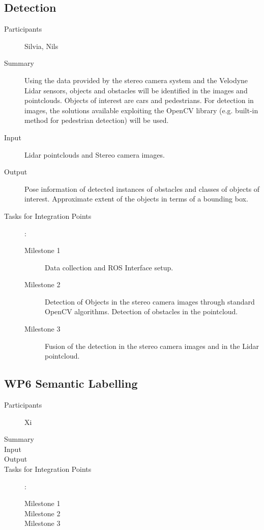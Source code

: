 \documentclass[11pt,a4paper]{article}
\begin{document}
\subsection{Detection} %

\begin{description}
\item[Participants] Silvia, Nils
\item[Summary]
	Using the data provided by the stereo camera system and the Velodyne Lidar sensors, objects and obstacles will be identified in the images and pointclouds. Objects of interest are cars and pedestrians. For detection in images, the solutions available exploiting the OpenCV library (e.g. built-in method for pedestrian detection) will be used. 
\item[Input]
	Lidar pointclouds and Stereo camera images.
\item[Output]
	Pose information of detected instances of obstacles and classes of objects of interest. Approximate extent of the objects in terms of a bounding box.
\item[Tasks for Integration Points]:\
	\begin{description}
		\item[Milestone 1]
			Data collection and ROS Interface setup.
		\item[Milestone 2]
			Detection of Objects in the stereo camera images through standard OpenCV algorithms. Detection of obstacles in the pointcloud.
		\item[Milestone 3]
			Fusion of the detection in the stereo camera images and in the Lidar pointcloud.
	\end{description}	 
\end{description}

\subsection{WP6 Semantic Labelling} %

\begin{description}
\item[Participants] Xi
\item[Summary]
\item[Input]
\item[Output]
\item[Tasks for Integration Points]:\
	\begin{description}
		\item[Milestone 1]
		\item[Milestone 2]
		\item[Milestone 3] 
	\end{description}	 
\end{description}
\end{document}
